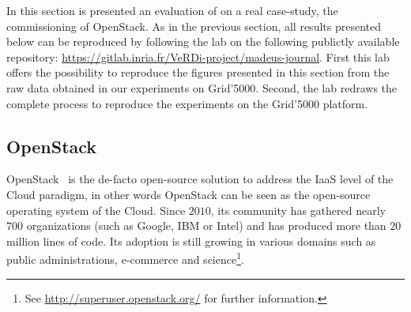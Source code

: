 
\graphicspath{{images/}}

In this section is presented an evaluation of \mad on a real
case-study, the commissioning of OpenStack. As in the previous
section, all results presented below can be reproduced by following
the lab on the following publictly available repository:
\url{https://gitlab.inria.fr/VeRDi-project/madeus-journal}. First this
lab offers the possibility to reproduce the figures presented in this
section from the raw data obtained in our experiments on
Grid'5000. Second, the lab redraws the complete process to reproduce
the experiments on the Grid'5000 platform.

\subsection{OpenStack}
\label{subsec:openstack}

OpenStack~\cite{os:7923796} is the de-facto open-source solution to
address the IaaS level of the Cloud paradigm, in other words OpenStack
can be seen as the open-source operating system of the Cloud. Since
$2010$, its community has gathered nearly $700$ organizations (such as
Google, IBM or Intel) and has produced more than $20$ million lines of
code. Its adoption is still growing in various domains such as public
administrations, e-commerce and science\footnote{See
  \url{http://superuser.openstack.org/} for further information.}.

